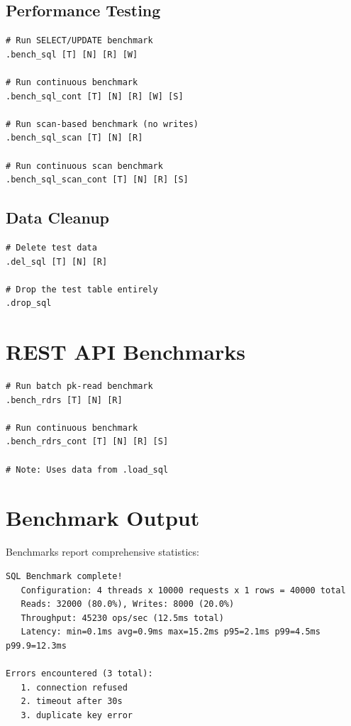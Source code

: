 \documentclass[11pt,a4paper]{report}
\begin{document}
\subsection{Performance Testing}

\begin{lstlisting}[language=rondb]
# Run SELECT/UPDATE benchmark
.bench_sql [T] [N] [R] [W]

# Run continuous benchmark
.bench_sql_cont [T] [N] [R] [W] [S]

# Run scan-based benchmark (no writes)
.bench_sql_scan [T] [N] [R]

# Run continuous scan benchmark
.bench_sql_scan_cont [T] [N] [R] [S]
\end{lstlisting}

\subsection{Data Cleanup}

\begin{lstlisting}[language=rondb]
# Delete test data
.del_sql [T] [N] [R]

# Drop the test table entirely
.drop_sql
\end{lstlisting}

\section{REST API Benchmarks}

\begin{lstlisting}[language=rondb]
# Run batch pk-read benchmark
.bench_rdrs [T] [N] [R]

# Run continuous benchmark
.bench_rdrs_cont [T] [N] [R] [S]

# Note: Uses data from .load_sql
\end{lstlisting}

\section{Benchmark Output}

Benchmarks report comprehensive statistics:

\begin{lstlisting}
SQL Benchmark complete!
   Configuration: 4 threads x 10000 requests x 1 rows = 40000 total
   Reads: 32000 (80.0%), Writes: 8000 (20.0%)
   Throughput: 45230 ops/sec (12.5ms total)
   Latency: min=0.1ms avg=0.9ms max=15.2ms p95=2.1ms p99=4.5ms p99.9=12.3ms

Errors encountered (3 total):
   1. connection refused
   2. timeout after 30s
   3. duplicate key error
\end{lstlisting}
\end{document}
